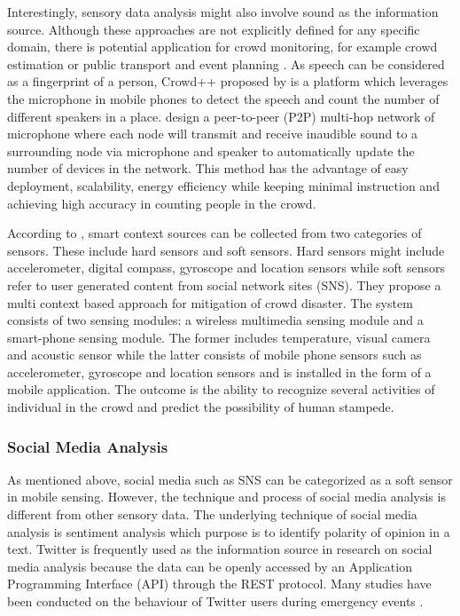 Interestingly, sensory data analysis might also involve sound as the information source. Although these approaches are not explicitly defined for any specific domain, there is potential application for crowd monitoring, for example crowd estimation \citep{Xu2013} or public transport and event planning \citep{Kannan2012}. As speech can be considered as a fingerprint of a person, Crowd++ proposed by \citet{Xu2013} is a platform which leverages the microphone in mobile phones to detect the speech and count the number of different speakers in a place. \citet{Kannan2012} design a peer-to-peer (P2P) multi-hop network of microphone where each node will transmit and receive inaudible sound to a surrounding node via microphone and speaker to automatically update the number of devices in the network. This method has the advantage of easy deployment, scalability, energy efficiency while keeping minimal instruction and achieving high accuracy in counting people in the crowd.

According to \citet{Ramesh2014}, smart context sources can be collected from two categories of sensors. These include hard sensors and soft sensors. Hard sensors might include accelerometer, digital compass, gyroscope and location sensors while soft sensors refer to user generated content from social network sites (SNS). They propose a multi context based approach for mitigation of crowd disaster. The system consists of two sensing modules: a wireless multimedia sensing module and a smart-phone sensing module. The former includes temperature, visual camera and acoustic sensor while the latter consists of mobile phone sensors such as accelerometer, gyroscope and location sensors and is installed in the form of a mobile application. The outcome is the ability to recognize several activities of individual in the crowd and predict the possibility of human stampede.

\subsubsection{Social Media Analysis}
As mentioned above, social media such as SNS can be categorized as a soft sensor in mobile sensing. However, the technique and process of social media analysis is different from other sensory data. The underlying technique of social media analysis is sentiment analysis which purpose is to identify polarity of opinion in a text. Twitter is frequently used as the information source in research on social media analysis because the data can be openly accessed by an Application Programming Interface (API) through the REST protocol. Many studies have been conducted on the behaviour of Twitter users during emergency events \citep{Hughes2009,Sakaki2010,Vieweg2010,Yin2012}.

